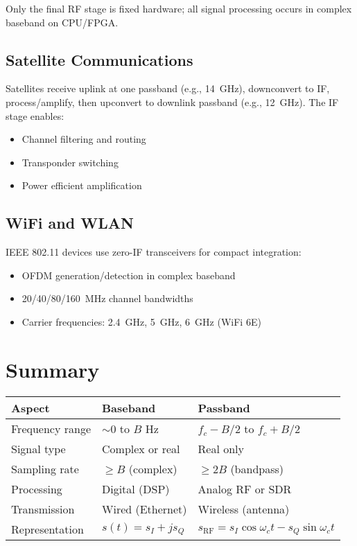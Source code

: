 Only the final RF stage is fixed hardware; all signal processing occurs in complex baseband on CPU/FPGA.

\subsection{Satellite Communications}

Satellites receive uplink at one passband (e.g., 14~GHz), downconvert to IF, process/amplify, then upconvert to downlink passband (e.g., 12~GHz). The IF stage enables:
\begin{itemize}
\item Channel filtering and routing
\item Transponder switching
\item Power efficient amplification
\end{itemize}

\subsection{WiFi and WLAN}

IEEE 802.11 devices use zero-IF transceivers for compact integration:
\begin{itemize}
\item OFDM generation/detection in complex baseband
\item 20/40/80/160~MHz channel bandwidths
\item Carrier frequencies: 2.4~GHz, 5~GHz, 6~GHz (WiFi 6E)
\end{itemize}

\section{Summary}

\begin{center}
\begin{tabular}{@{}lll@{}}
\toprule
\textbf{Aspect} & \textbf{Baseband} & \textbf{Passband} \\
\midrule
Frequency range & $\sim 0$ to $B$ Hz & $f_c - B/2$ to $f_c + B/2$ \\
Signal type & Complex or real & Real only \\
Sampling rate & $\geq B$ (complex) & $\geq 2B$ (bandpass) \\
Processing & Digital (DSP) & Analog RF or SDR \\
Transmission & Wired (Ethernet) & Wireless (antenna) \\
Representation & $s(t) = s_I + js_Q$ & $s_{\text{RF}} = s_I\cos\omega_c t - s_Q\sin\omega_c t$ \\
\bottomrule
\end{tabular}
\end{center}

